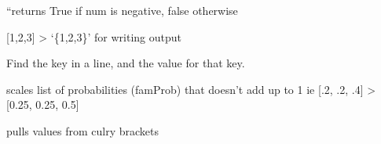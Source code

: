 \documentclass[letterpaper,10pt,english]{sphinxmanual}
\begin{document}
\begin{fulllineitems}
\begin{fulllineitems}
\end{fulllineitems}


\begin{fulllineitems}
\label{\detokenize{pydfnworks:pydfnworks.helper.input_helper.is_negative}}
“returns True if num is negative, false otherwise

\end{fulllineitems}


\begin{fulllineitems}
\label{\detokenize{pydfnworks:pydfnworks.helper.input_helper.list_to_curly}}
{[}1,2,3{]} \textendash{}\textgreater{} ‘\{1,2,3\}’   for writing output

\end{fulllineitems}


\begin{fulllineitems}
\label{\detokenize{pydfnworks:pydfnworks.helper.input_helper.process_line}}
Find the key in a line, and the value for that key.

\end{fulllineitems}


\begin{fulllineitems}
\label{\detokenize{pydfnworks:pydfnworks.helper.input_helper.scale}}
scales list of probabilities (famProb) that doesn’t add up to 1
ie {[}.2, .2, .4{]} \textendash{}\textgreater{} {[}0.25, 0.25, 0.5{]}

\end{fulllineitems}


\begin{fulllineitems}
\label{\detokenize{pydfnworks:pydfnworks.helper.input_helper.val_helper}}
pulls values from culry brackets


\end{fulllineitems}
\end{fulllineitems}
\end{document}
